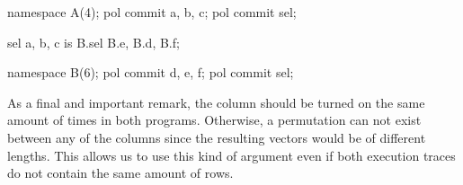 \begin{pil}
    namespace A(4);
    pol commit a, b, c;
    pol commit sel;
    
    sel {a, b, c} is B.sel {B.e, B.d, B.f};
    
    namespace B(6);
    pol commit d, e, f;
    pol commit sel;
\end{pil}

As a final and important remark, the \sel column should be turned on the same amount of times in both programs. Otherwise, a permutation can not exist between any of the columns since the resulting vectors would be of different lengths. This allows us to use this kind of argument even if both execution traces do not contain the same amount of rows.

    
    
    



